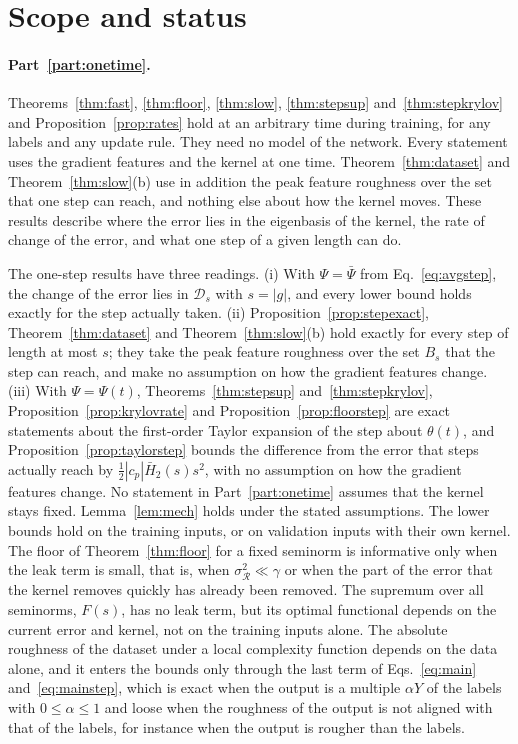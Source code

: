 \documentclass[11pt]{article}
\theoremstyle{definition}
\theoremstyle{remark}
\newcommand{\Rgh}{\mathcal{R}}           %
\newcommand{\sR}{\sigma_{\Rgh}}
\begin{document}
\section{Scope and status}\label{sec:status}

\paragraph{Part~\ref{part:onetime}.}
Theorems~\ref{thm:fast}, \ref{thm:floor}, \ref{thm:slow}, \ref{thm:stepsup} and~\ref{thm:stepkrylov} and Proposition~\ref{prop:rates} hold at an arbitrary time during training, for any labels and any update rule.
They need no model of the network.
Every statement uses the gradient features and the kernel at one time.
Theorem~\ref{thm:dataset} and Theorem~\ref{thm:slow}(b) use in addition the peak feature roughness over the set that one step can reach, and nothing else about how the kernel moves.
These results describe where the error lies in the eigenbasis of the kernel, the rate of change of the error, and what one step of a given length can do.

The one-step results have three readings.
(i) With $\Psi = \bar\Psi$ from Eq.~\eqref{eq:avgstep}, the change of the error lies in $\mathcal{D}_s$ with $s = |g|$, and every lower bound holds exactly for the step actually taken.
(ii) Proposition~\ref{prop:stepexact}, Theorem~\ref{thm:dataset} and Theorem~\ref{thm:slow}(b) hold exactly for every step of length at most $s$; they take the peak feature roughness over the set $B_s$ that the step can reach, and make no assumption on how the gradient features change.
(iii) With $\Psi = \Psi(t)$, Theorems~\ref{thm:stepsup} and~\ref{thm:stepkrylov}, Proposition~\ref{prop:krylovrate} and Proposition~\ref{prop:floorstep} are exact statements about the first-order Taylor expansion of the step about $\theta(t)$, and Proposition~\ref{prop:taylorstep} bounds the difference from the error that steps actually reach by $\tfrac12|c_p|\bar H_2(s)s^2$, with no assumption on how the gradient features change.
No statement in Part~\ref{part:onetime} assumes that the kernel stays fixed.
Lemma~\ref{lem:mech} holds under the stated assumptions.
The lower bounds hold on the training inputs, or on validation inputs with their own kernel.
The floor of Theorem~\ref{thm:floor} for a fixed seminorm is informative only when the leak term is small, that is, when $\sR^2 \ll \gamma$ or when the part of the error that the kernel removes quickly has already been removed.
The supremum over all seminorms, $F(s)$, has no leak term, but its optimal functional depends on the current error and kernel, not on the training inputs alone.
The absolute roughness of the dataset under a local complexity function depends on the data alone, and it enters the bounds only through the last term of Eqs.~\eqref{eq:main} and~\eqref{eq:mainstep}, which is exact when the output is a multiple $\alpha Y$ of the labels with $0 \le \alpha \le 1$ and loose when the roughness of the output is not aligned with that of the labels, for instance when the output is rougher than the labels.
\end{document}
